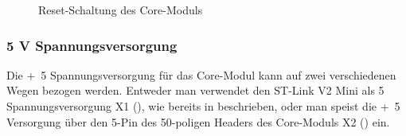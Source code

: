 \begin{figure}[H]
    \centering
    \qquad
    \qquad
    \caption[Reset-Schaltung des Core-Moduls]{Reset-Schaltung des \gls{Core-Modul}s}
    \label{fig:coremodul-reset}
\end{figure}

\subsubsection{5 V Spannungsversorgung}
Die \unit{+5}{\volt} Spannungsversorgung für das \gls{Core-Modul} kann auf zwei verschiedenen Wegen bezogen werden. Entweder man verwendet den ST-Link V2 Mini als \unit{5}{\volt} Spannungsversorgung X1 (), wie bereits in  beschrieben, oder man speist die \unit{+5}{\volt} Versorgung über den \unit{5}{\volt}-Pin des 50-poligen Headers des \gls{Core-Modul}s X2 () ein.


